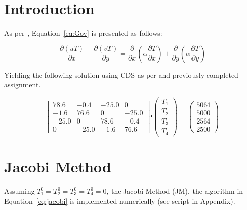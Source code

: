 
\chapter{Introduction}
\label{chap:intro}

As per \cite{assign}, Equation~\ref{eq:Gov} is presented as follows:

\begin{equation}
	\label{eq:Gov}	
	\frac{\partial(uT)}{\partial x} + \frac{\partial(vT)}{\partial y}= \frac{\partial}{\partial x} \left( \alpha \frac{\partial T}{\partial x} \right) + \frac{\partial}{\partial y} \left( \alpha \frac{\partial T}{\partial y} \right)
\end{equation}

Yielding the following solution using CDS as per \cite{assign} and previously completed assignment.

\begin{equation*}
	\begin{bmatrix}
		78.6	&	-0.4	&	-25.0 	&	0		\\
		-1.6	&	76.6 	&	0  		&	-25.0	\\
		-25.0	&	0   	&	78.6	&	-0.4	\\
		0  		&	-25.0	&	-1.6	&	76.6
	\end{bmatrix}
	\centerdot 
	\begin{pmatrix} T_1	\\	T_2	\\	T_3	\\ T_4	\end{pmatrix}
	=
	\begin{pmatrix} 5064	\\	5000	\\	2564	\\ 2500 \end{pmatrix}	
\end{equation*}

\chapter{Jacobi Method}
\label{chap:jacobi}

Assuming $T_1^0=T_2^0=T_3^0=T_4^0=0$, the Jacobi Method (JM), the algorithm in Equation~\ref{eq:jacobi} \cite{cfdbook} is implemented numerically (see script \cite{python} in Appendix).

